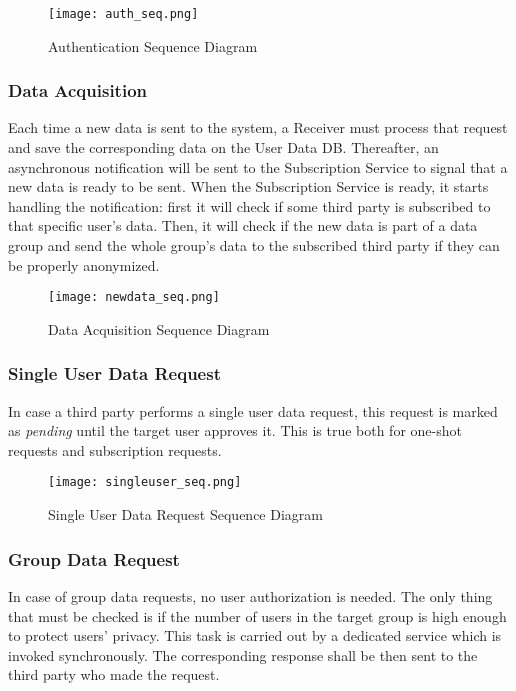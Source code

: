 \FloatBarrier
\begin{figure}[!h]
	\centering
	\texttt{[image: auth\_seq.png]}
	\caption{Authentication Sequence Diagram}
\end{figure}
\FloatBarrier

\subsubsection{Data Acquisition}
Each time a new data is sent to the system, a Receiver must process that request and save the corresponding data on the User Data DB. Thereafter, an asynchronous notification will be sent to the Subscription Service to signal that a new data is ready to be sent.
When the Subscription Service is ready, it starts handling the notification: first it will check if some third party is subscribed to that specific user's data. Then, it will check if the new data is part of a data group and send the whole group's data to the subscribed third party if they can be properly anonymized.

\FloatBarrier
\begin{figure}[!h]
	\centering
	\texttt{[image: newdata\_seq.png]}
	\caption{Data Acquisition Sequence Diagram}
\end{figure}
\FloatBarrier

\subsubsection{Single User Data Request}
In case a third party performs a single user data request, this request is marked as \textit{pending} until the target user approves it. This is true both for one-shot requests and subscription requests.

\FloatBarrier
\begin{figure}[!h]
	\centering
	\texttt{[image: singleuser\_seq.png]}
	\caption{Single User Data Request Sequence Diagram}
\end{figure}
\FloatBarrier

\subsubsection{Group Data Request}
In case of group data requests, no user authorization is needed.
The only thing that must be checked is if the number of users in the target group is high enough to protect users' privacy. This task is carried out by a dedicated service which is invoked synchronously.
The corresponding response shall be then sent to the third party who made the request.

